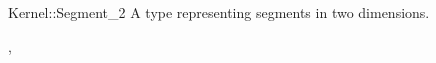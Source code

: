 \begin{ccRefConcept}{Kernel::Segment_2}
A type representing segments in two dimensions.

\ccRefines
{},

\ccSeeAlso
{}

\end{ccRefConcept}
